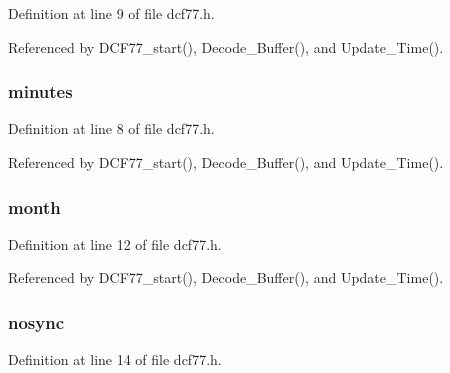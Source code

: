 Definition at line 9 of file dcf77.\-h.



Referenced by D\-C\-F77\-\_\-start(), Decode\-\_\-\-Buffer(), and Update\-\_\-\-Time().

\hypertarget{struct_time___date___format_a517646d9969ae9c9f8921e133b1b872b}{
\subsubsection[{minutes}]{ minutes}}\label{struct_time___date___format_a517646d9969ae9c9f8921e133b1b872b}


Definition at line 8 of file dcf77.\-h.



Referenced by D\-C\-F77\-\_\-start(), Decode\-\_\-\-Buffer(), and Update\-\_\-\-Time().

\hypertarget{struct_time___date___format_ad5f8cd6773aef677b920ae4e4265bb10}{
\subsubsection[{month}]{ month}}\label{struct_time___date___format_ad5f8cd6773aef677b920ae4e4265bb10}


Definition at line 12 of file dcf77.\-h.



Referenced by D\-C\-F77\-\_\-start(), Decode\-\_\-\-Buffer(), and Update\-\_\-\-Time().

\hypertarget{struct_time___date___format_aa1bb3da10a284c040c7fcf3943b36d58}{
\subsubsection[{nosync}]{ nosync}}\label{struct_time___date___format_aa1bb3da10a284c040c7fcf3943b36d58}


Definition at line 14 of file dcf77.\-h.



